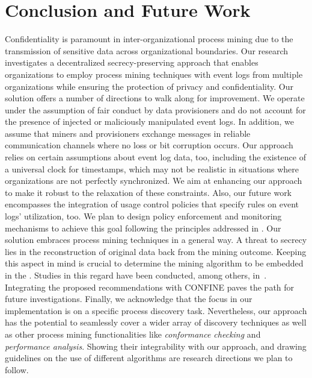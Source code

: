 \section{Conclusion and Future Work}
\label{sec:conclusion}
Confidentiality is paramount in inter-organizational
process mining due to the transmission of sensitive data across organizational boundaries. Our research investigates a decentralized secrecy-preserving approach that enables organizations to employ process mining techniques with event logs from multiple organizations while ensuring the protection of privacy and confidentiality. Our solution offers a number of directions %
to walk along for improvement. We operate under the assumption of fair conduct by data provisioners and do not account for the presence of injected or maliciously manipulated event logs. In addition, we assume that miners and provisioners exchange messages in reliable communication channels where no loss or bit corruption occurs. Our approach relies on certain assumptions about event log data, too, including the existence of a universal clock for timestamps, which may not be realistic in situations where organizations are not perfectly synchronized. %
We aim at enhancing our approach to make it robust to the relaxation of these constraints. Also, our future work encompasses the integration of usage control policies that specify rules on event logs' utilization, too. We plan to design policy enforcement and monitoring mechanisms to achieve this goal following the principles addressed in \cite{basile2023blockchain,basile2023solid}. Our solution embraces process mining techniques in a general way. %
A threat to secrecy lies in the reconstruction of original data back from the mining outcome. Keeping this aspect in mind is crucial to determine the mining algorithm to be embedded in the . Studies in this regard have been conducted, among others, in~\cite{DBLP:conf/caise/VoigtFJKTMLW20,DBLP:journals/is/FahrenkrogPetersenKAW23}. Integrating the proposed recommendations with CONFINE paves the path for future investigations.
%
Finally, we acknowledge that the focus in our implementation is on a specific process discovery task. Nevertheless, our approach has the potential to seamlessly cover a wider array of discovery techniques as well as other process mining functionalities like \textit{conformance checking} and \textit{performance analysis}. Showing their integrability with our approach, and drawing guidelines on the use of different algorithms are research directions we plan to follow.



